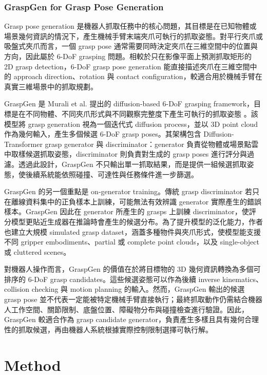 \documentclass[12pt,a4paper]{article}
\begin{document}
\subsubsection{GraspGen for Grasp Pose Generation}

Grasp pose generation 是機器人抓取任務中的核心問題，其目標是在已知物體或場景幾何資訊的情況下，產生機械手臂末端夾爪可執行的抓取姿態。對平行夾爪或吸盤式夾爪而言，一個 grasp pose 通常需要同時決定夾爪在三維空間中的位置與方向，因此屬於 6-DoF grasping 問題。相較於只在影像平面上預測抓取矩形的 2D grasp detection，6-DoF grasp pose generation 能直接描述夾爪在三維空間中的 approach direction、rotation 與 contact configuration，較適合用於機械手臂在真實三維場景中的抓取規劃。

GraspGen 是 Murali et al. 提出的 diffusion-based 6-DoF grasping framework，目標是在不同物體、不同夾爪形式與不同觀察完整度下產生可執行的抓取姿態 \cite{graspgen}。該模型將 grasp generation 視為一個迭代式 diffusion process，並以 3D point cloud 作為幾何輸入，產生多個候選 6-DoF grasp poses。其架構包含 Diffusion-Transformer grasp generator 與 discriminator：generator 負責從物體或場景點雲中取樣候選抓取姿態，discriminator 則負責對生成的 grasp poses 進行評分與過濾。透過此設計，GraspGen 不只輸出單一抓取結果，而是提供一組候選抓取姿態，使後續系統能依照碰撞、可達性與任務條件進一步篩選。

GraspGen 的另一個重點是 on-generator training。傳統 grasp discriminator 若只在離線資料集中的正負樣本上訓練，可能無法有效辨識 generator 實際產生的錯誤樣本。GraspGen 因此在 generator 所產生的 grasps 上訓練 discriminator，使評分模型更貼近生成器在推論時會產生的候選分布。為了提升模型的泛化能力，作者也建立大規模 simulated grasp dataset，涵蓋多種物件與夾爪形式，使模型能支援不同 gripper embodiments、partial 或 complete point clouds，以及 single-object 或 cluttered scenes。

對機器人操作而言，GraspGen 的價值在於將目標物的 3D 幾何資訊轉換為多個可排序的 6-DoF grasp candidates。這些候選姿態可以作為後續 inverse kinematics、collision checking 與 motion planning 的輸入。然而，GraspGen 輸出的候選 grasp pose 並不代表一定能被特定機械手臂直接執行；最終抓取動作仍需結合機器人工作空間、關節限制、底盤位置、障礙物分布與碰撞檢查進行驗證。因此，GraspGen 較適合作為 grasp candidate generator，負責產生多樣且具有幾何合理性的抓取候選，再由機器人系統根據實際控制限制選擇可執行解。

\section{Method}
\end{document}
